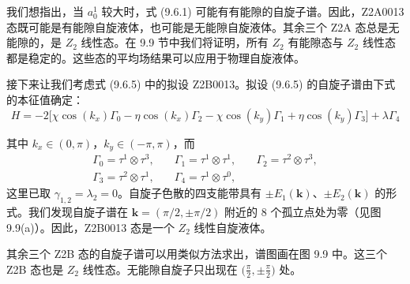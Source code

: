 我们想指出，当 $a_{0}^{1}$ 较大时，式 (9.6.1) 可能有有能隙的自旋子谱。因此，Z2A0013 态既可能是有能隙自旋液体，也可能是无能隙自旋液体。其余三个 Z2A 态总是无能隙的，是 $Z_{2}$ 线性态。在 9.9 节中我们将证明，所有 $Z_{2}$ 有能隙态与 $Z_{2}$ 线性态都是稳定的。这些态的平均场结果可以应用于物理自旋液体。

接下来让我们考虑式 (9.6.5) 中的拟设 Z2B0013。拟设 (9.6.5) 的自旋子谱由下式的本征值确定：
\begin{equation*}
H=-2\big[\chi\cos(k_{x})\Gamma_{0}-\eta\cos(k_{x})\Gamma_{2}-\chi\cos(k_{y})\Gamma_{1}+\eta\cos(k_{y})\Gamma_{3}\big]+\lambda\Gamma_{4}
\end{equation*}


其中 $k_{x}\in(0,\pi)$，$k_{y}\in(-\pi,\pi)$，而
\begin{equation*}
\begin{array}{rcl}
\Gamma_{0}=\tau^{1}\otimes\tau^{3}, & \quad\Gamma_{1}=\tau^{1}\otimes\tau^{1}, & \quad\Gamma_{2}=\tau^{2}\otimes\tau^{3},\\[2pt]
\Gamma_{3}=\tau^{2}\otimes\tau^{1}, & \quad\Gamma_{4}=\tau^{1}\otimes\tau^{0}, &
\end{array}
\end{equation*}
这里已取 $\gamma_{1,2}=\lambda_{2}=0$。自旋子色散的四支能带具有 $\pm E_{1}(\pmb{k})$、$\pm E_{2}(\pmb{k})$ 的形式。我们发现自旋子谱在 $\pmb{k}=(\pi/2,\pm\pi/2)$ 附近的 8 个孤立点处为零（见图 9.9(a)）。因此，Z2B0013 态是一个 $Z_{2}$ 线性自旋液体。

其余三个 Z2B 态的自旋子谱可以用类似方法求出，谱图画在图 9.9 中。这三个 Z2B 态也是 $Z_{2}$ 线性态。无能隙自旋子只出现在 $\big(\frac{\pi}{2},\pm\frac{\pi}{2}\big)$ 处。

